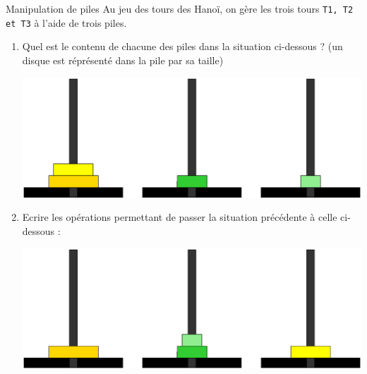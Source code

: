 \documentclass[10pt]{beamer}
\begin{document}
\begin{frame}{\SL}
	\mframe{\SL}
	\begin{exampleblock}{Manipulation de piles}
		Au jeu des tours des Hanoï, on gère les trois tours {\tt T1, T2 et T3} à l'aide de trois piles.
		\begin{enumerate}
			\item<2-> Quel est le contenu de chacune des piles dans la situation ci-dessous ? (un disque est réprésenté dans la pile par sa taille)
			      \begin{center}
				      \includegraphics[scale=0.14]{hanoi_dep.eps}
			      \end{center}
			\item<3-> Ecrire les opérations permettant de passer la situation précédente à celle ci-dessous :
			      \begin{center}
				      \includegraphics[scale=0.18]{hanoi_fin.eps}
			      \end{center}
		\end{enumerate}
	\end{exampleblock}
\end{frame}
\end{document}
